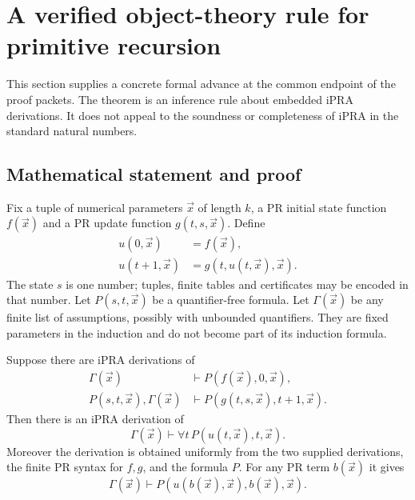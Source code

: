 \section{A verified object-theory rule for primitive recursion}
\label{sec:object-iteration}

This section supplies a concrete formal advance at the common endpoint of
the proof packets. The theorem is an inference rule about embedded iPRA
derivations. It does not appeal to the soundness or completeness of iPRA in
the standard natural numbers.

\subsection{Mathematical statement and proof}

Fix a tuple of numerical parameters $\vec x$ of length $k$, a PR initial
state function $f(\vec x)$ and a PR update function $g(t,s,\vec x)$. Define
\begin{align*}
 u(0,\vec x)&=f(\vec x),\\
 u(t+1,\vec x)&=g(t,u(t,\vec x),\vec x).
\end{align*}
The state $s$ is one number; tuples, finite tables and certificates may be
encoded in that number. Let $P(s,t,\vec x)$ be a quantifier-free formula.
Let $\Gamma(\vec x)$ be any finite list of assumptions, possibly with
unbounded quantifiers. They are fixed parameters in the induction and do
not become part of its induction formula.

\begin{theorem}\label{thm:object-rule}
Suppose there are iPRA derivations of
\begin{align}
 \Gamma(\vec x)&\vdash P(f(\vec x),0,\vec x),\label{eq:object-base}\\
 P(s,t,\vec x),\Gamma(\vec x)&\vdash
 P(g(t,s,\vec x),t+1,\vec x).\label{eq:object-step}
\end{align}
Then there is an iPRA derivation of
\[
 \Gamma(\vec x)\vdash\forall t\,P(u(t,\vec x),t,\vec x).
\]
Moreover the derivation is obtained uniformly from the two supplied
derivations, the finite PR syntax for $f,g$, and the formula $P$.
For any PR term $b(\vec x)$ it gives
\[
 \Gamma(\vec x)\vdash
 P(u(b(\vec x),\vec x),b(\vec x),\vec x).
\]
\end{theorem}

